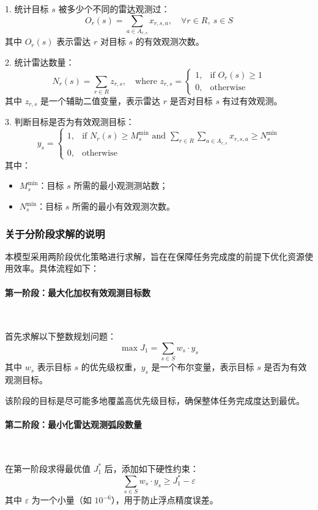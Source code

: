 \documentclass[openany,12pt,UTF8]{ctexart}
\begin{document}
1. 统计目标 $s$ 被多少个不同的雷达观测过：
$$
    O_r(s) = \sum_{a \in A_{r,s}} x_{r,s,a}, \quad \forall r \in R,\ s \in S
$$
其中 $O_r(s)$ 表示雷达 $r$ 对目标 $s$ 的有效观测次数。

2. 统计雷达数量：
$$
    N_r(s) = \sum_{r \in R} z_{r,s}, \quad \text{where } z_{r,s} = 
    \begin{cases}
        1, & \text{if } O_r(s) \geq 1 \\
        0, & \text{otherwise}
    \end{cases}
$$
其中 $z_{r,s}$ 是一个辅助二值变量，表示雷达 $r$ 是否对目标 $s$ 有过有效观测。

3. 判断目标是否为有效观测目标：
$$
    y_s = 
    \begin{cases}
        1, & \text{if } N_r(s) \geq M_s^{\min} \text{ and } \sum_{r \in R} \sum_{a \in A_{r,s}} x_{r,s,a} \geq N_s^{\min} \\
        0, & \text{otherwise}
    \end{cases}
$$
其中：
\begin{itemize}
    \item $M_s^{\min}$：目标 $s$ 所需的最小观测测站数；
    \item $N_s^{\min}$：目标 $s$ 所需的最小有效观测次数。
\end{itemize}

\subsubsection{关于分阶段求解的说明}
本模型采用两阶段优化策略进行求解，旨在在保障任务完成度的前提下优化资源使用效率。具体流程如下：

\paragraph{第一阶段：最大化加权有效观测目标数}\

首先求解以下整数规划问题：
$$
    \max J_1 = \sum_{s \in S} w_s \cdot y_s
$$
其中 $w_s$ 表示目标 $s$ 的优先级权重，$y_s$ 是一个布尔变量，表示目标 $s$ 是否为有效观测目标。

该阶段的目标是尽可能多地覆盖高优先级目标，确保整体任务完成度达到最优。

\paragraph{第二阶段：最小化雷达观测弧段数量}\

在第一阶段求得最优值 $J_1^*$ 后，添加如下硬性约束：
$$
    \sum_{s \in S} w_s \cdot y_s \geq J_1^* - \varepsilon
$$
其中 $\varepsilon$ 为一个小量（如 $10^{-6}$），用于防止浮点精度误差。
\end{document}
